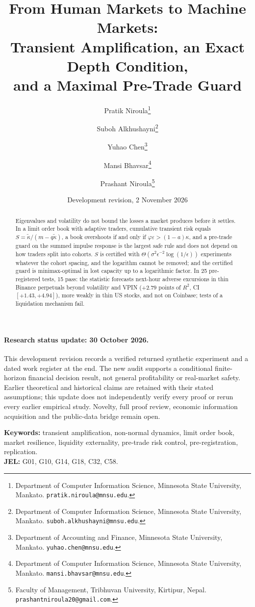 \documentclass[12pt]{article}
\title{From Human Markets to Machine Markets:\\
Transient Amplification, an Exact Depth Condition,\\ and a Maximal Pre-Trade Guard}
\author{Pratik Niroula\thanks{Department of Computer Information Science, Minnesota State University, Mankato. \texttt{pratik.niroula@mnsu.edu}.}
\and Suboh Alkhushayni\thanks{Department of Computer Information Science, Minnesota State University, Mankato. \texttt{suboh.alkhushayni@mnsu.edu}.}
\and Yuhao Chen\thanks{Department of Accounting and Finance, Minnesota State University, Mankato. \texttt{yuhao.chen@mnsu.edu}.}
\and Mansi Bhavsar\thanks{Department of Computer Information Science, Minnesota State University, Mankato. \texttt{mansi.bhavsar@mnsu.edu}.}
\and Prashant Niroula\thanks{Faculty of Management, Tribhuvan University, Kirtipur, Nepal. \texttt{prashantniroula20@gmail.com}.}}
\date{Development revision, 2 November 2026}
\theoremstyle{definition}
\theoremstyle{remark}
\begin{document}
\maketitle
\thispagestyle{empty}

\begin{abstract}
\noindent Eigenvalues and volatility do not bound the losses a market produces before it settles. In a limit order book with adaptive traders, cumulative transient risk equals $S=\tilde\kappa/(m-q\tilde\kappa)$, a book overshoots if and only if $\varphi\varepsilon>(1-a)\kappa$, and a pre-trade guard on the summed impulse response is the largest safe rule and does not depend on how traders split into cohorts. $S$ is certified with $\Theta(\sigma^2\epsilon^{-2}\log(1/\epsilon))$ experiments whatever the cohort spacing, and the logarithm cannot be removed; and the certified guard is minimax-optimal in lost capacity up to a logarithmic factor. In 25 pre-registered tests, 15 pass: the statistic forecasts next-hour adverse excursions in thin Binance perpetuals beyond volatility and VPIN ($+2.79$ points of $R^2$, CI $[+1.43,+4.94]$), more weakly in thin US stocks, and not on Coinbase; tests of a liquidation mechanism fail.
\end{abstract}

\paragraph{Research status update: 30 October 2026.}
This development revision records a verified returned synthetic experiment and
a dated work register at the end. The new audit supports a conditional
finite-horizon financial decision result, not general profitability or
real-market safety. Earlier theoretical and historical claims are retained
with their stated assumptions; this update does not independently verify every
proof or rerun every earlier empirical study. Novelty, full proof review,
economic information acquisition and the public-data bridge remain open.


\noindent\textbf{Keywords:} transient amplification, non-normal dynamics, limit order book, market resilience, liquidity externality, pre-trade risk control, pre-registration, replication.\\
\textbf{JEL:} G01, G10, G14, G18, C32, C58.
\end{document}

